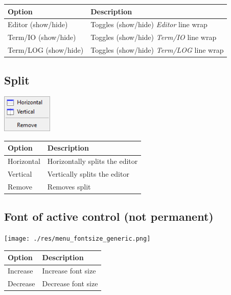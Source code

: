 \begin{scriptsize}
  \begin{tabularx}{\textwidth}{>{\hsize=0.3\hsize}X>{\hsize=0.7\hsize}X}\\
    \hline
    \textbf{Option} & \textbf{Description} \\
    \hline
    Editor (show/hide) & Toggles (show/hide) \textit{Editor} line wrap \\
    Term/IO (show/hide) & Toggles (show/hide) \textit{Term/IO} line wrap \\
    Term/LOG (show/hide) & Toggles (show/hide) \textit{Term/LOG} line wrap \\
    \hline
  \end{tabularx}
\end{scriptsize}


\hypertarget{menu_view_split}{}
\subsection{Split}

\includegraphics[scale=0.50]{./res/menu_view_split.png}\\

\begin{scriptsize}
  \begin{tabularx}{\textwidth}{>{\hsize=0.3\hsize}X>{\hsize=0.7\hsize}X}\\
    \hline
    \textbf{Option} & \textbf{Description} \\
    \hline
    Horizontal & Horizontally splits the editor \\
    Vertical & Vertically splits the editor \\
    Remove & Removes split \\
    \hline
  \end{tabularx}
\end{scriptsize}


\hypertarget{menu_view_fontsize}{}
\subsection{Font of active control (not permanent)}

\texttt{[image: ./res/menu\_fontsize\_generic.png]}\\

\begin{scriptsize}
  \begin{tabularx}{\textwidth}{>{\hsize=0.3\hsize}X>{\hsize=0.7\hsize}X}\\
    \hline
    \textbf{Option} & \textbf{Description} \\
    \hline
    Increase & Increase font size \\
    Decrease & Decrease font size \\
    \hline
  \end{tabularx}
\end{scriptsize}
